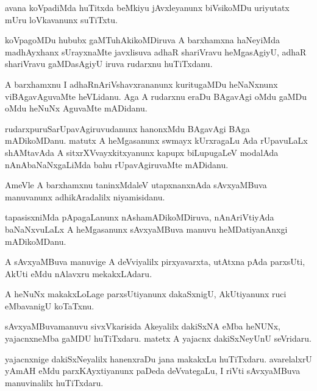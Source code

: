 \documentclass{article}
\begin{document}
\begin{mn}
avana koVpadiMda huTitxda beMkiyu jAvxleyanunx biVsikoMDu uriyutatx
mUru loVkavanunx suTiTxtu.
\end{mn}

\begin{mn}%
koVpagoMDu hububx gaMTuhAkikoMDiruva A barxhamxna haNeyiMda
madhAyxhanx sUrayxnaMte javxlisuva adhaR shariVravu heMgasAgiyU, adhaR
shariVravu gaMDasAgiyU iruva rudarxnu huTiTxdanu.
\end{mn}

\begin{mn}
A barxhamxnu I adhaRnAriVshavxrananunx kuritugaMDu heNaNxnunx
viBAgavAguvaMte heVLidanu. Aga A rudarxnu eraDu BAgavAgi oMdu gaMDu
oMdu heNuNx AguvaMte mADidanu.
\end{mn}

\begin{mn}
rudarxpuruSarUpavAgiruvudanunx hanonxMdu BAgavAgi BAga
mADikoMDanu. matutx A heMgasanunx swmayx kUrxragaLu Ada rUpavuLaLx
shAMtavAda A sitxrXVvayxkitxyanunx kapupx biLupugaLeV modalAda
nAnAbaNaNxgaLiMda bahu rUpavAgiruvaMte mADidanu.
\end{mn}

\begin{mn}
AmeVle A barxhamxnu taninxMdaleV utapxnanxnAda sAvxyaMBuva manuvanunx
adhikAradalilx niyamisidanu.
\end{mn}

\begin{mn}%
tapasisxniMda pApagaLanunx nAshamADikoMDiruva, nAnAriVtiyAda
baNaNxvuLaLx A heMgasanunx sAvxyaMBuva manuvu heMDatiyanAnxgi mADikoMDanu.
\end{mn}

\begin{mn}
A sAvxyaMBuva manuvige A deVviyalilx pirxyavarxta, utAtxna pAda
parxsUti, AkUti eMdu nAlavxru mekakxLAdaru.
\end{mn}

\begin{mn}
A heNuNx makakxLoLage parxsUtiyanunx dakaSxnigU, AkUtiyanunx ruci
eMbavanigU koTaTxnu.
\end{mn}

\begin{mn}
sAvxyaMBuvamanuvu sivxVkarisida Akeyalilx dakiSxNA eMba heNUNx,
yajacnxneMba gaMDU huTiTxdaru. matetx A yajacnx dakiSxNeyUnU seVridaru.
\end{mn}

\begin{mn}
yajacnxnige dakiSxNeyalilx hanenxraDu jana makakxLu
huTiTxdaru. avarelalxrU yAmAH eMdu parxKAyxtiyanunx paDeda
deVvategaLu, I riVti sAvxyaMBuva manuvinalilx huTiTxdaru.
\end{mn}
\end{document}

